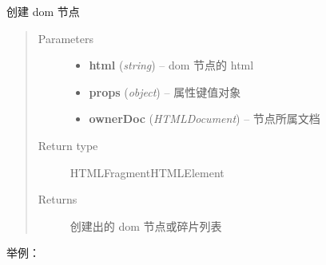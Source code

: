 \documentclass[letterpaper,10pt,english]{sphinxmanual}
\begin{document}
\begin{fulllineitems}
\label{api/core/dom/create:DOM.create}
创建 dom 节点
\begin{quote}\begin{description}
\item[{Parameters}] \leavevmode\begin{itemize}
\item {}
\textbf{html} (\emph{string}) -- dom 节点的 html

\item {}
\textbf{props} (\emph{object}) -- 属性键值对象

\item {}
\textbf{ownerDoc} (\emph{HTMLDocument}) -- 节点所属文档

\end{itemize}

\item[{Return type}] \leavevmode
HTMLFragment\textbar{}HTMLElement

\item[{Returns}] \leavevmode
创建出的 dom 节点或碎片列表

\end{description}\end{quote}

\end{fulllineitems}


举例：
\end{document}
